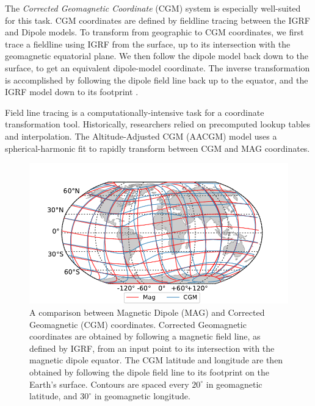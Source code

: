 The \emph{Corrected Geomagnetic Coordinate} (CGM) \citep{Hakura1965} system is especially well-suited for this task. CGM coordinates are defined by fieldline tracing between the IGRF and Dipole models. To transform from geographic to CGM coordinates, we first trace a fieldline using IGRF from the surface, up to its intersection with the geomagnetic equatorial plane. We then follow the dipole model back down to the surface, to get an equivalent dipole-model coordinate. The inverse transformation is accomplished by following the dipole field line back up to the equator, and the IGRF model down to its footprint \citep{Laundal2016}.

Field line tracing is a computationally-intensive task for a coordinate transformation tool. Historically, researchers relied on precomputed lookup tables and interpolation. The Altitude-Adjusted CGM (AACGM) model \citep{Baker1989, Shepherd2014} uses a spherical-harmonic fit to rapidly transform between CGM and MAG coordinates.

\begin{figure}[t]
\begin{center}
\includegraphics{figures/CGM_globe_comparison.pdf}
\caption[Comparison of Magnetic Dipole (MAG) and Corrected Geomagnetic (CGM) coordinates]{A comparison between Magnetic Dipole (MAG) and Corrected Geomagnetic (CGM) coordinates. Corrected Geomagnetic coordinates are obtained by following a magnetic field line, as defined by IGRF, from an input point to its intersection with the magnetic dipole equator. The CGM latitude and longitude are then obtained by following the dipole field line to its footprint on the Earth's surface. Contours are spaced every $20^\circ$ in geomagnetic latitude, and $30^\circ$ in geomagnetic longitude.}
\label{fig:CGM_globe_comparison}
\end{center}
\end{figure}    

